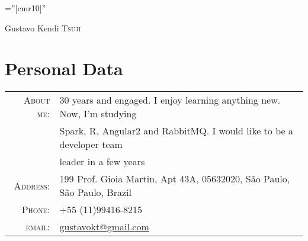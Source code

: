 \documentclass[a4paper,10pt]{article}
\begin{document}

\pagestyle{empty} %

\font\fb=''[cmr10]'' %

\par{\centering
    {\Huge Gustavo Kendi \textsc{Tsuji}
  }\bigskip\par}

\section{Personal Data}

\begin{tabular}{rl}
  \textsc{About me:}   & 30 years and engaged. I enjoy learning anything new. Now, I'm studying \\
    &Spark, R, Angular2 and RabbitMQ. I would like to  be a developer team\\
    & leader in a few years\\
    \textsc{Address:}   & 199 Prof. Gioia Martin, Apt 43A, 05632020, São Paulo, São Paulo, Brazil \\
    \textsc{Phone:}     & +55 (11)99416-8215\\
    \textsc{email:}     & \href{mailto:gustavokt@gmail.com}{gustavokt@gmail.com}
\end{tabular}

\end{document}
